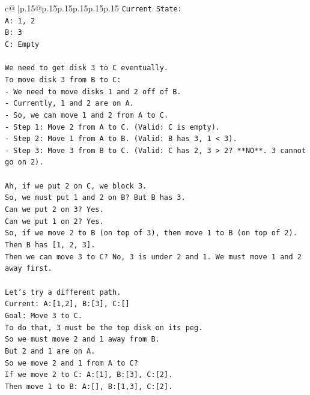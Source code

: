 \documentclass{article}
\begin{document}
{\begin{supertabular}{c@{$\;$}|p{.15\linewidth}@{}p{.15\linewidth}p{.15\linewidth}p{.15\linewidth}p{.15\linewidth}p{.15\linewidth}}
{{{\texttt{Current State:} \\
\texttt{A: 1, 2} \\
\texttt{B: 3} \\
\texttt{C: Empty} \\
\\ 
\texttt{We need to get disk 3 to C eventually.} \\
\texttt{To move disk 3 from B to C:} \\
\texttt{{-} We need to move disks 1 and 2 off of B.} \\
\texttt{{-} Currently, 1 and 2 are on A.} \\
\texttt{{-} So, we can move 1 and 2 from A to C.} \\
\texttt{{-} Step 1: Move 2 from A to C. (Valid: C is empty).} \\
\texttt{{-} Step 2: Move 1 from A to B. (Valid: B has 3, 1 < 3).} \\
\texttt{{-} Step 3: Move 3 from B to C. (Valid: C has 2, 3 > 2? **NO**. 3 cannot go on 2).} \\
\\ 
\texttt{Ah, if we put 2 on C, we block 3.} \\
\texttt{So, we must put 1 and 2 on B? But B has 3.} \\
\texttt{Can we put 2 on 3? Yes.} \\
\texttt{Can we put 1 on 2? Yes.} \\
\texttt{So, if we move 2 to B (on top of 3), then move 1 to B (on top of 2).} \\
\texttt{Then B has {[}1, 2, 3{]}.} \\
\texttt{Then we can move 3 to C? No, 3 is under 2 and 1. We must move 1 and 2 away first.} \\
\\ 
\texttt{Let's try a different path.} \\
\texttt{Current: A:{[}1,2{]}, B:{[}3{]}, C:{[}{]}} \\
\texttt{Goal: Move 3 to C.} \\
\texttt{To do that, 3 must be the top disk on its peg.} \\
\texttt{So we must move 2 and 1 away from B.} \\
\texttt{But 2 and 1 are on A.} \\
\texttt{So we move 2 and 1 from A to C?} \\
\texttt{If we move 2 to C: A:{[}1{]}, B:{[}3{]}, C:{[}2{]}.} \\
\texttt{Then move 1 to B: A:{[}{]}, B:{[}1,3{]}, C:{[}2{]}.} \\
}}}
\end{supertabular}}
\end{document}
